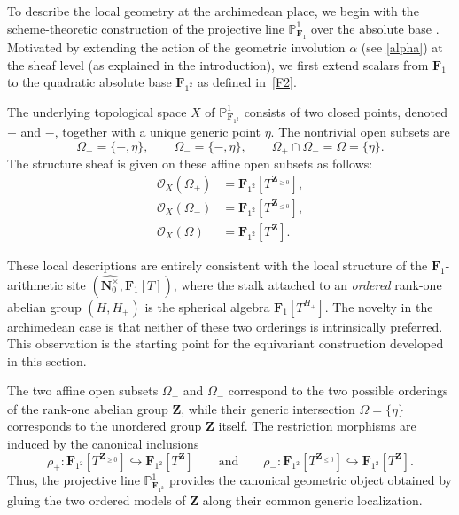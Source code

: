 \documentclass[11pt,a4paper]{article}
\newcommand{\N}{\mathbf{N}}
\renewcommand{\P}{\mathbb{P}}
\newcommand{\Z}{\mathbf{Z}}
\newcommand{\Fone}{\mathbf{F}_{1}}
\newcommand{\Ftwo}{\mathbf{F}_{1^2}}
\newcommand{\nato}{\widehat{\N^\times_0}}
\begin{document}
To describe the local geometry at the archimedean place, we begin with the
scheme-theoretic construction of the projective line $\P^1_{\Fone}$ over the
absolute base \cite{CC10}. Motivated by extending the action of the geometric involution $\alpha$ (see \eqref{alpha})  at the sheaf level (as explained in the introduction), we  first extend scalars from $\Fone$ to the
quadratic absolute base $\Ftwo$ as defined in~\eqref{F2}.

The underlying topological space $X$ of $\P^1_{\Ftwo}$ consists of two closed points, denoted
$+$ and $-$, together with a unique generic point $\eta$. The nontrivial open
subsets are
\begin{equation}\label{opens1}
\Omega_+=\{+,\eta\},\qquad
\Omega_-=\{-,\eta\},\qquad \Omega_+\cap \Omega_- = \Omega=\{\eta\}.
\end{equation}
The structure sheaf is given on these affine open subsets as follows:
\begin{equation*}
\begin{aligned}
\mathcal O_X(\Omega_+) &= \Ftwo[T^{\Z_{\ge0}}],\\
\mathcal O_X(\Omega_-) &= \Ftwo[T^{\Z_{\le0}}],\\
\mathcal O_X(\Omega)   &= \Ftwo[T^{\Z}].
\end{aligned}
\end{equation*}

These local descriptions are entirely consistent with the local structure of
the $\Fone$-arithmetic site $(\nato,\Fone[T])$, where the stalk attached to an \emph{ordered} rank-one abelian
group $(H,H_+)$ is the spherical algebra $\Fone[T^{H_+}]$. The novelty in the archimedean case is that neither of these two
orderings is intrinsically preferred. This observation is the starting point
for the equivariant construction developed in this section.






The two affine open subsets $\Omega_+$ and $\Omega_-$ correspond to the two
possible orderings of the rank-one abelian group $\Z$, while their generic
intersection
$
\Omega=\{\eta\}
$
corresponds to the unordered group $\Z$ itself. The restriction morphisms are
induced by the canonical inclusions
\[
\rho_+:\Ftwo[T^{\Z_{\ge 0}}]\hookrightarrow \Ftwo[T^{\Z}]
\qquad\text{and}\qquad
\rho_-:\Ftwo[T^{\Z_{\le 0}}]\hookrightarrow \Ftwo[T^{\Z}].
\]
Thus, the projective line $\P^1_{\Ftwo}$ provides the canonical geometric
object obtained by gluing the two ordered models of $\Z$ along their common
generic localization.\vspace{.05in}
\end{document}
